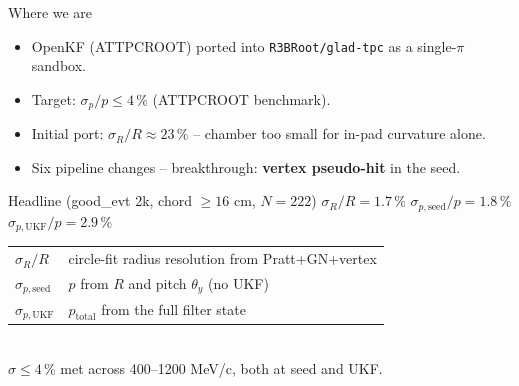 \documentclass[aspectratio=169]{beamer}
\begin{document}
\begin{frame}{Where we are}
\begin{itemize}
  \item OpenKF (ATTPCROOT) ported into \texttt{R3BRoot/glad-tpc} as a single-$\pi$ sandbox.
  \item Target: $\sigma_p / p \le 4\,\%$ (ATTPCROOT benchmark).
  \item Initial port: $\sigma_R / R \approx 23\,\%$ -- chamber too small for in-pad curvature alone.
  \item Six pipeline changes -- breakthrough: \textbf{vertex pseudo-hit} in the seed.
\end{itemize}
\vfill
\begin{block}{Headline (good\_evt 2k, chord $\ge 16$ cm, $N=222$)}
\centering\large
$\sigma_R/R = \mathbf{1.7\,\%}$ \quad
$\sigma_{p,\text{seed}}/p = \mathbf{1.8\,\%}$ \quad
$\sigma_{p,\text{UKF}}/p = \mathbf{2.9\,\%}$
\end{block}
\centering
\scriptsize
\begin{tabular}{@{}ll@{}}
$\sigma_R/R$            & circle-fit radius resolution from Pratt+GN+vertex \\
$\sigma_{p,\text{seed}}$ & $p$ from $R$ and pitch $\theta_y$ (no UKF) \\
$\sigma_{p,\text{UKF}}$  & $p_\text{total}$ from the full filter state \\
\end{tabular}\\[0.3em]
\small
\textcolor{good}{$\sigma \le 4\,\%$ met across 400--1200 MeV/c, both at seed and UKF.}
\end{frame}
\end{document}
